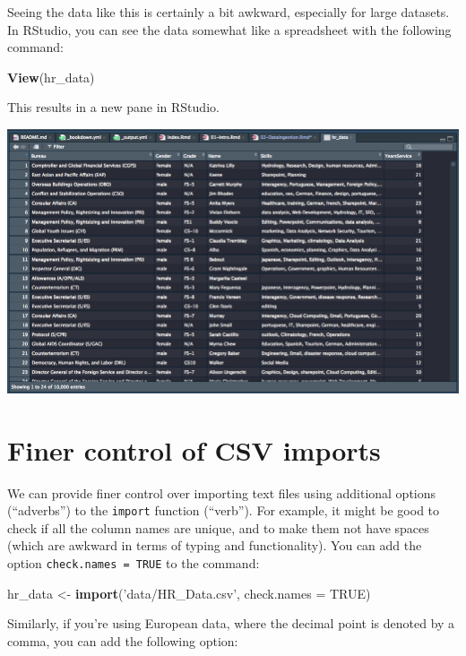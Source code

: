 \documentclass[12pt,letterpaperpaper,openany]{book}
\newenvironment{Shaded}{\begin{snugshade}}{\end{snugshade}}
\newcommand{\DataTypeTok}[1]{\textcolor[rgb]{0.13,0.29,0.53}{#1}}
\newcommand{\KeywordTok}[1]{\textcolor[rgb]{0.13,0.29,0.53}{\textbf{#1}}}
\newcommand{\NormalTok}[1]{#1}
\newcommand{\OtherTok}[1]{\textcolor[rgb]{0.56,0.35,0.01}{#1}}
\newcommand{\StringTok}[1]{\textcolor[rgb]{0.31,0.60,0.02}{#1}}
\begin{document}
Seeing the data like this is certainly a bit awkward, especially for large datasets.
In RStudio, you can see the data somewhat like a spreadsheet with the following command:

\begin{Shaded}
\begin{Highlighting}[]
\KeywordTok{View}\NormalTok{(hr_data)}
\end{Highlighting}
\end{Shaded}

This results in a new pane in RStudio.

\includegraphics{img/Viewer.png}

\hypertarget{finer-control-of-csv-imports}{%
\section{Finer control of CSV imports}\label{finer-control-of-csv-imports}}

We can provide finer control over importing text files using additional options (``adverbs'') to
the \texttt{import} function (``verb''). For example, it might be good to check if all the column
names are unique, and to make them not have spaces (which are awkward in terms of typing and functionality). You can add the option \texttt{check.names\ =\ TRUE} to the command:

\begin{Shaded}
\begin{Highlighting}[]
\NormalTok{hr_data <-}\StringTok{ }\KeywordTok{import}\NormalTok{(}\StringTok{'data/HR_Data.csv'}\NormalTok{, }\DataTypeTok{check.names =} \OtherTok{TRUE}\NormalTok{)}
\end{Highlighting}
\end{Shaded}

Similarly, if you're using European data, where the decimal point is denoted by a comma, you can
add the following option:
\end{document}
